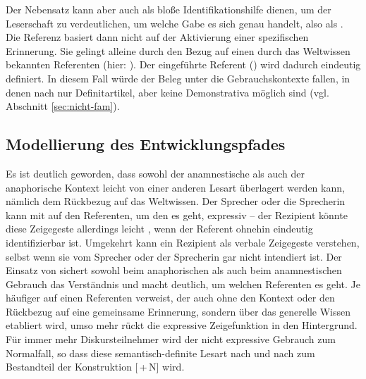 \noindent 
Der Nebensatz kann aber auch als bloße Identifikationshilfe dienen, um der Leserschaft zu verdeutlichen, um welche Gabe es sich genau handelt, also als  \parencite[79]{Himmelmann1997}. Die Referenz basiert dann nicht auf der Aktivierung einer spezifischen Erinnerung. Sie gelingt alleine durch den Bezug auf einen durch das Weltwissen bekannten Referenten (hier: ). Der eingeführte Referent () wird dadurch eindeutig definiert.  In diesem Fall würde der Beleg unter die  Gebrauchskontexte fallen, in denen nach \textcite{Hawkins1978} nur Definitartikel, aber keine Demonstrativa möglich sind (vgl. Abschnitt \ref{sec:nicht-fam}). 

%
%

\subsection{Modellierung des Entwicklungspfades}\label{sec:disk-entwicklung}

Es ist deutlich geworden, dass sowohl der anamnestische als auch der anaphorische Kontext leicht von einer anderen Lesart überlagert werden kann, nämlich dem Rückbezug auf das Weltwissen. Der Sprecher oder die Sprecherin kann mit   auf den Referenten, um den es geht, expressiv  -- der Rezipient könnte diese Zeigegeste allerdings leicht , wenn der Referent ohnehin eindeutig identifizierbar ist. Umgekehrt kann ein Rezipient  als verbale Zeigegeste verstehen, selbst wenn sie vom Sprecher oder der Sprecherin gar nicht intendiert ist.
Der Einsatz von  sichert sowohl beim anaphorischen als auch beim anamnestischen Gebrauch das Verständnis und macht deutlich, um welchen Referenten es geht. Je häufiger  auf einen Referenten verweist, der auch ohne den Kontext oder den Rückbezug auf eine gemeinsame Erinnerung, sondern über das generelle Wissen etabliert wird, umso mehr rückt die expressive Zeigefunktion in den Hintergrund. Für immer mehr Diskursteilnehmer wird der nicht expressive Gebrauch zum Normalfall, so dass diese semantisch-definite Lesart nach und nach zum Bestandteil der Konstruktion [\,+\,N] wird. 

